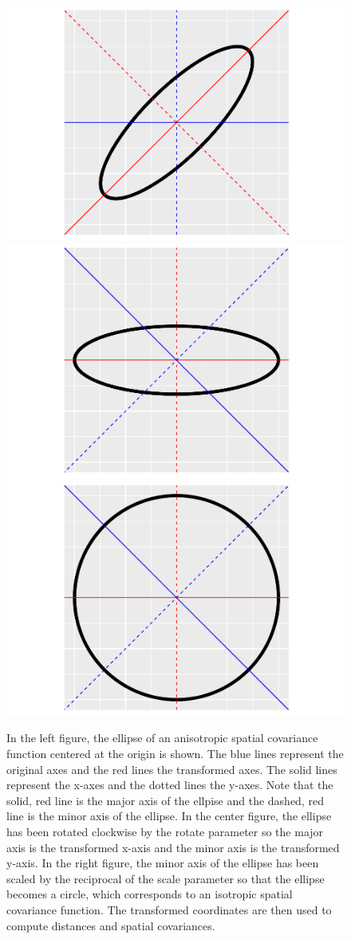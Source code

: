 \documentclass{article}
\begin{document}
\begin{figure}
\includegraphics[width=0.33\linewidth]{supplementary_files/figure-latex/anisotropy2-1} \includegraphics[width=0.33\linewidth]{supplementary_files/figure-latex/anisotropy2-2} \includegraphics[width=0.33\linewidth]{supplementary_files/figure-latex/anisotropy2-3} \caption{In the left figure, the ellipse of an anisotropic spatial covariance function centered at the origin is shown. The blue lines represent the original axes and the red lines the transformed axes. The solid lines represent the x-axes and the dotted lines the y-axes. Note that the solid, red line is the major axis of the ellpise and the dashed, red line is the minor axis of the ellipse. In the center figure, the ellipse has been rotated clockwise by the rotate parameter so the major axis is the transformed x-axis and the minor axis is the transformed y-axis. In the right figure, the minor axis of the ellipse has been scaled by the reciprocal of the scale parameter so that the ellipse becomes a circle, which corresponds to an isotropic spatial covariance function. The transformed coordinates are then used to compute distances and spatial covariances.}\label{fig:anisotropy2}
\end{figure}
\end{document}
